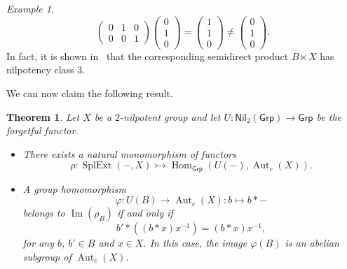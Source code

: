 \documentclass[reqno,hidelinks,a4paper]{amsart}
\theoremstyle{plain}
\newtheorem{theorem}[subsection]{Theorem}
\theoremstyle{definition}
\theoremstyle{remark}
\newtheorem{example}[subsection]{Example}
\numberwithin{equation}{section}
\DeclareMathOperator{\Aut}{Aut}
\DeclareMathOperator{\Hom}{Hom}
\DeclareMathOperator{\SplExt}{SplExt}
\DeclareMathOperator{\Imm}{Im}
\newcommand{\Grp}{\ensuremath{\mathsf{Grp}}}
\newcommand{\Nil}{\ensuremath{\mathsf{Nil}}}
\begin{document}
\begin{example}
\[\begin{pmatrix}
            0 & 1 & 0 \\
            0 & 0 & 1
        \end{pmatrix}\begin{pmatrix}
            0 \\ 1 \\ 0
        \end{pmatrix}=\begin{pmatrix}
            1 \\ 1 \\ 0
        \end{pmatrix} \neq \begin{pmatrix}
            0 \\ 1 \\ 0
        \end{pmatrix}.
    \]
    In fact, it is shown in~\cite{XabiMancini} that the corresponding semidirect product \(B\ltimes X\) has nilpotency class \(3\).
\end{example}

We can now claim the following result.

\begin{theorem}\label{main_thm}
    Let \(X\) be a \(2\)-nilpotent group and let \(U \colon \Nil_2(\Grp) \to \Grp\) be the forgetful functor.
    \begin{itemize}
        \item[(i)] There exists a natural monomorphism of functors
              \[
                  \rho \colon \SplExt(-,X) \rightarrowtail \Hom_\Grp(U(-),\Aut_c(X)).
              \]

        \item[(ii)] A group homomorphism
              \[
                  \varphi \colon U(B) \to \Aut_c(X) \colon b \mapsto b \ast -
              \]
              belongs to \(\Imm(\rho_B)\) if and only if
              \begin{equation}\label{act_mor}
                  b' \ast ((b \ast x)x^{-1})=(b \ast x)x^{-1},
              \end{equation}
              for any \(b\), \(b' \in B\) and \(x \in X\). In this case, the image \(\varphi(B)\) is an abelian subgroup of \(\Aut_c(X)\).
    \end{itemize}
\end{theorem}
\end{document}
